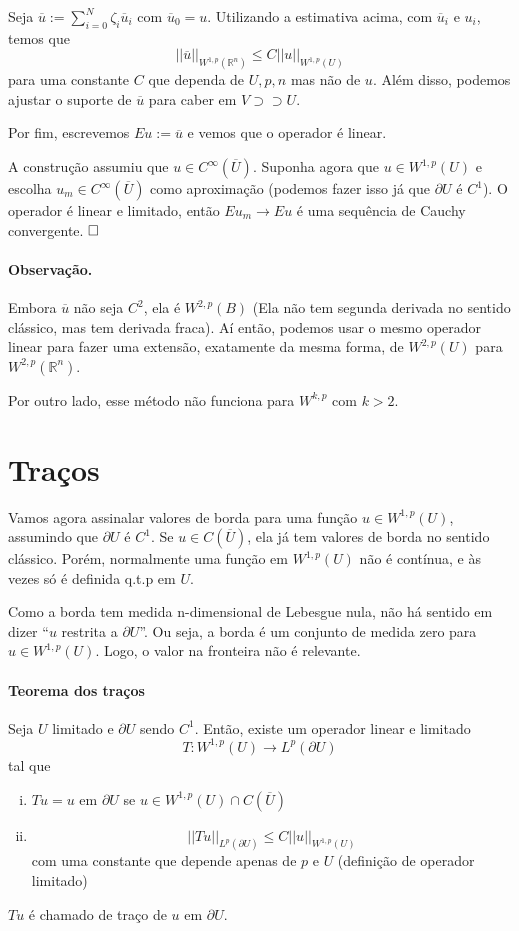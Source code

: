 \documentclass[11pt]{article}
\newcommand{\qed}{$\hfill\square$}
\newcommand{\Rn}{{\mathbb{R}^n}}
\newcommand{\pu}{\partial U}
\begin{document}
Seja \( \overline{u} := \sum_{i=0}^{N} \zeta_i \overline{u}_i \) com \( \overline{u}_0 = u \).  Utilizando a estimativa acima, com \( \overline{u}_i \) e \( u_i \), temos que \[ ||\overline{u}||_{W^{1,p}(\Rn)} \leq C ||u||_{W^{1,p}(U)} \]
para uma constante \( C \) que dependa de \( U,p,n \) mas não de \( u \). Além disso, podemos ajustar o suporte de \( \overline{u} \) para caber em \( V \supset\supset U \).

Por fim, escrevemos \( Eu:=\overline{u} \) e vemos que o operador é linear. 

A construção assumiu que \( u \in C^\infty(\overline{U}) \). Suponha agora que \( u \in W^{1,p}(U) \) e escolha \( u_m \in C^\infty(\overline{U}) \) como aproximação (podemos fazer isso já que \( \pu  \) é \( C^1 \)). O operador é linear e limitado, então \( Eu_m \rightarrow Eu \) é uma sequência de Cauchy convergente. \qed

\paragraph{Observação.} Embora $ \overline{u} $ não seja $ C^2 $, ela é $ W^{2,p}(B) $ (Ela não tem segunda derivada no sentido clássico, mas tem derivada fraca). Aí então, podemos usar o mesmo operador linear para fazer uma extensão, exatamente da mesma forma, de $ W^{2,p}(U) $ para $ W^{2,p}(\Rn) $.

Por outro lado, esse método não funciona para $ W^{k,p} $ com $ k>2 $.




\section{Traços}

Vamos agora assinalar valores de borda para uma função $u \in W^{1,p}(U)$, assumindo que $\pu$ é $C^1$. Se $u \in C(\overline{U})$, ela já tem valores de borda no sentido clássico. Porém, normalmente uma função em $W^{1,p}(U)$ não é contínua, e às vezes só é definida q.t.p em $U$. 

Como a borda tem medida n-dimensional de Lebesgue nula, não há sentido em dizer ``$ u $ restrita a $ \pu $''. Ou seja, a borda é um conjunto de medida zero para $u \in W^{1,p}(U)$. Logo, o valor na fronteira não é relevante.





\paragraph{Teorema dos traços} Seja $U$ limitado e $\pu$ sendo $C^1$. Então, existe um operador linear e limitado \[ T:W^{1,p}(U)\rightarrow L^p(\pu) \] tal que \begin{enumerate}[(i)]
	\item $Tu = u$ em $\pu$ se $u \in W^{1,p}(U) \cap C(\overline{U})$
	\item \[ || Tu ||_{L^p(\pu)} \leq C ||u||_{W^{1,p}(U)} \] com uma constante que depende apenas de $p$ e $U$ (definição de operador limitado)
\end{enumerate} $Tu$ é chamado de traço de $u$ em $\pu$.
\end{document}
